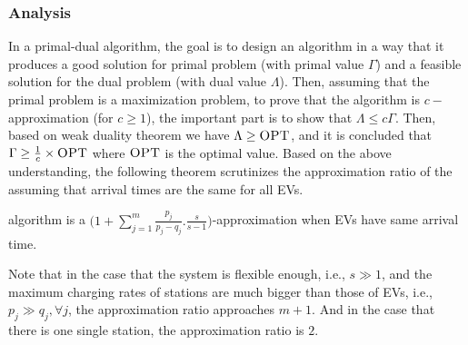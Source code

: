 		\subsubsection{Analysis}
		\label{subsec:analysis}
		In a primal-dual algorithm, the goal is to design an algorithm in a way that it produces a good solution for primal problem (with primal value $\Gamma$) and a feasible solution for the dual problem (with dual value $\Lambda$). Then, assuming that the primal problem is a maximization problem, to prove that the algorithm is $c-$approximation (for $c\geq 1$), the important part is to show that $\Lambda\leq c\Gamma$. Then, based on weak duality theorem we have $\Lambda\geq \textsc{OPT}$, and it is concluded that $\Gamma \geq \frac{1}{c}\times\textsc{OPT}$ where $\textsc{OPT}$ is the optimal value. 
		Based on the above understanding, the following theorem scrutinizes the approximation ratio of the \ics assuming that arrival times are the same for all EVs. 
		
		\begin{thm}
			\label{thm:approx}
			\ics algorithm is a $\Big( 1+ \sum_{j=1}^m {\frac{p_j}{p_j-q_j}}.\frac{s}{s-1}\Big)$-approximation when EVs have same arrival time.
		\end{thm}
%		
		
		Note that in the case that the system is flexible enough, i.e., $s\gg 1$, and the maximum charging rates of stations are much bigger than those of EVs, i.e., $p_j \gg q_j, \forall j$, the approximation ratio approaches $m+1$. And in the case that there is one single station, the approximation ratio is $2$.

%

